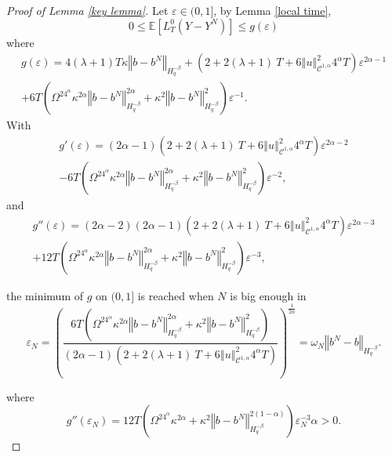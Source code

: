 \documentclass[11pt]{article}
\newcommand{\norme}[1]{\left\Vert #1\right\Vert}
\newcommand{\E}{\mathbb{E}}
\begin{document}
\begin{proof}[Proof of Lemma \ref{key lemma}]
    Let $\varepsilon\in(0,1]$, by Lemma \ref{local time},    
    \begin{equation*}
    0\leq\E\left[L^0_T(Y-Y^N)\right]\leq g(\varepsilon)
    \end{equation*}
    where \begin{multline*}
    g(\varepsilon) = 4(\lambda + 1)T\kappa\norme{b-b^N}_{H^{-\beta}_{q}} + \left(2 + 2(\lambda + 1)\ T + 6\norme{u}_{\mathcal{C}^{1,\alpha}}^2 4^{\alpha}T\right) \varepsilon^{2\alpha-1} \\ + 6T\left(\Omega^24^{\alpha}\kappa^{2\alpha} \norme{b-b^N}_{H^{-\beta}_q}^{2\alpha}+\kappa^2\norme{b-b^N}_{H^{-\beta}_{q}}^2\right)\varepsilon^{-1}.
    \end{multline*}    
    With \begin{multline*}
    g'(\varepsilon)=(2\alpha-1)\left(2 + 2(\lambda + 1)\ T + 6\norme{u}_{\mathcal{C}^{1,\alpha}}^2 4^{\alpha}T\right)\varepsilon^{2\alpha-2}\\-6T\left(\Omega^24^{\alpha}\kappa^{2\alpha} \norme{b-b^N}_{H^{-\beta}_q}^{2\alpha}+\kappa^2\norme{b-b^N}_{H^{-\beta}_{q}}^2\right)\varepsilon^{-2},
    \end{multline*}
    and 
    \begin{multline*}
    g''(\varepsilon)=(2\alpha-2)(2\alpha-1)\left(2 + 2(\lambda + 1)\ T + 6\norme{u}_{\mathcal{C}^{1,\alpha}}^2 4^{\alpha}T\right)\varepsilon^{2\alpha-3}\\+12T\left(\Omega^24^{\alpha}\kappa^{2\alpha} \norme{b-b^N}_{H^{-\beta}_q}^{2\alpha}+\kappa^2\norme{b-b^N}_{H^{-\beta}_{q}}^2\right)\varepsilon^{-3},\end{multline*}
    
    the minimum of $g$ on $(0,1]$ is reached when $N$ is big enough in \begin{equation*}
    \varepsilon_N=\left(\frac{6T\left(\Omega^24^{\alpha}\kappa^{2\alpha} \norme{b-b^N}_{H^{-\beta}_q}^{2\alpha}+\kappa^2\norme{b-b^N}_{H^{-\beta}_{q}}^2\right)}{(2\alpha-1)\left(2 + 2(\lambda + 1)\ T + 6\norme{u}_{\mathcal{C}^{1,\alpha}}^2 4^{\alpha}T\right)}\right)^{\frac{1}{2\alpha}}=\omega_N \norme{b^N-b}_{H^{-\beta}_{q}}.
    \end{equation*}
    
    where 
    \begin{equation*}
    g''(\varepsilon_N)
    =12T\left(\Omega^24^{\alpha}\kappa^{2\alpha} +\kappa^2\norme{b-b^N}_{H^{-\beta}_{q}}^{2(1-\alpha)}\right)\varepsilon_N^{-3}\alpha>0.
    \end{equation*}
    

\end{proof}
\end{document}
